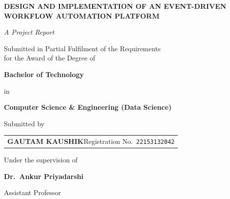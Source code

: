\documentclass[12pt, a4paper, oneside]{report}
\begin{document}
\begin{titlepage}
\centering
{

{\fontsize{14pt}{18pt}\bfseries
DESIGN AND IMPLEMENTATION OF AN EVENT-DRIVEN\\[2pt]
WORKFLOW AUTOMATION PLATFORM\par}

\vspace{0.5cm}

{\fontsize{12pt}{14pt}\itshape A Project Report\par}

\vspace{0.5cm}

{\fontsize{12pt}{15pt}
Submitted in Partial Fulfilment of the Requirements\\
for the Award of the Degree of\par}

\vspace{0.5cm}

{\fontsize{12pt}{15pt}\bfseries Bachelor of Technology\par}
\vspace{0.1cm}
{\fontsize{12pt}{15pt} in\par}
\vspace{0.1cm}
{\fontsize{12pt}{15pt}\bfseries Computer Science \& Engineering (Data Science)\par}

\vspace{0.6cm}

{\fontsize{12pt}{15pt} Submitted by\par}
\vspace{0.3cm}

\begin{tabular}{l}
\textbf{GAUTAM KAUSHIK}\quad Registration No.\ \texttt{22153132042} \\
\end{tabular}

\vspace{0.6cm}

{\fontsize{12pt}{15pt} Under the supervision of\par}
\vspace{0.2cm}
{\fontsize{12pt}{15pt}\bfseries Dr.\ Ankur Priyadarshi\par}
{\fontsize{12pt}{15pt} Assistant Professor\par}

}
\end{titlepage}
\end{document}
